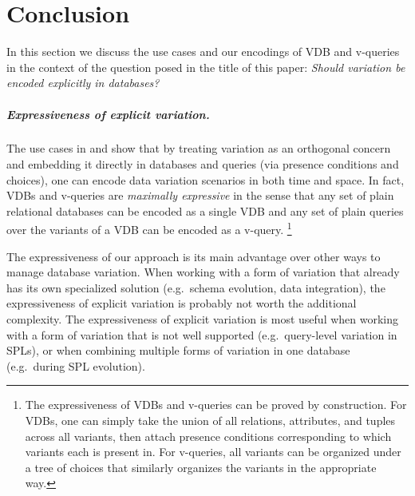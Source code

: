\chapter{Conclusion}
\label{ch:conclusion}



In this section we discuss the use cases and our encodings of VDB and v-queries
in the context of the question posed in the title of this paper: \emph{Should
variation be encoded explicitly in databases?}


\paragraph{Expressiveness of explicit variation.}
%
The use cases in  and  show that by treating
variation as an orthogonal concern and embedding it directly in databases and
queries (via presence conditions and choices), one can encode data variation
scenarios in both time and space.
%
In fact, VDBs and v-queries are \emph{maximally expressive} in the sense that
any set of plain relational databases can be encoded as a single VDB and any
set of plain queries over the variants of a VDB can be encoded as a v-query.%
%
\footnote{The expressiveness of VDBs and v-queries can be proved by
construction. For VDBs, one can simply take the union of all relations,
attributes, and tuples across all variants, then attach presence conditions
corresponding to which variants each is present in. For v-queries, all variants
can be organized under a tree of choices that similarly organizes the variants
in the appropriate way.}


The expressiveness of our approach is its main advantage over other ways to
manage database variation. When working with a form of variation that already
has its own specialized solution (e.g.\ schema evolution, data integration),
the expressiveness of explicit variation is probably not worth the additional
complexity.
%
The expressiveness of explicit variation is most useful when working with a
form of variation that is not well supported (e.g.\ query-level variation in
SPLs), or when combining multiple forms of variation in one database (e.g.\
during SPL evolution).


